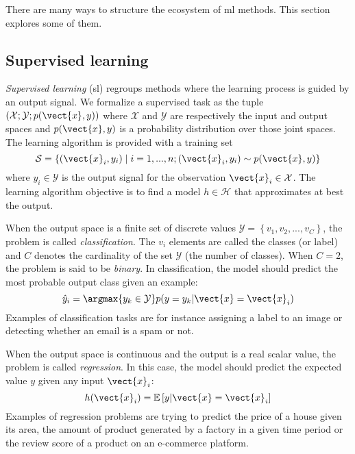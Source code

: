 There are many ways to structure the ecosystem of \acrlong{ml} methods. This
section explores some of them.

\subsection{Supervised learning}
\label{ssec:backml:sl}

\textit{Supervised learning} (\acrshort{sl}) regroups methods where the learning
process is guided by an output signal. We formalize a supervised task as the tuple
$\left(\mathcal{X}; \mathcal{Y}; p(\vect{x}, y)\right)$ where $\mathcal{X}$ and
$\mathcal{Y}$ are respectively the input and output spaces and $p(\vect{x}, y)$
is a probability distribution over those joint spaces. The learning algorithm is
provided with a training set
\begin{equation}
\label{eqn:backml:supervised}
\mathcal{S} = \left\{(\vect{x}_i, y_i) \mid i = 1,...,n ; (\vect{x}_i, y_i) \sim p(\vect{x}, y) \right\}
\end{equation}
where $y_i \in \mathcal{Y}$ is the output signal for the observation
$\vect{x}_i \in \mathcal{X}$. The learning algorithm objective is to find a model
$h \in \mathcal{H}$ that approximates at best the output.

When the output space is a finite set of discrete values
$\mathcal{Y} = \left\{v_1, v_2, ..., v_C\right\}$, the problem is called
\textit{classification}. The $v_i$ elements are called the classes (or label) and
$C$ denotes the cardinality of the set $\mathcal{Y}$ (\ie the number of classes).
When $C = 2$, the problem is said to be \textit{binary}. In classification, the
model should predict the most probable output class given an example:
\begin{equation}
\hat{y}_i = \argmax{y_k \in \mathcal{Y}} p(y=y_k|\vect{x}=\vect{x}_i)
\end{equation}
Examples of classification tasks are for instance assigning a label to an image
or detecting whether an email is a spam or not.

When the output space is continuous and the output is a real scalar value, the
problem is called \textit{regression}. In this case, the model should predict the
expected value $y$ given any input $\vect{x}_i$:
\begin{equation}
h(\vect{x}_i) = \mathbb{E}\left[y|\vect{x}=\vect{x}_i\right]
\end{equation}
Examples of regression problems are trying to predict the price of a house given
its area, the amount of product generated by a factory in a given time period or
the review score of a product on an e-commerce platform.

